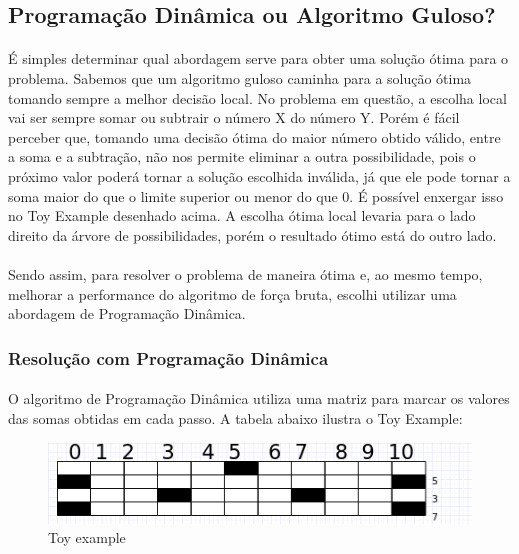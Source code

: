 \documentclass[a4paper, 12pt]{article}
\begin{document}
\subsection{Programação Dinâmica ou Algoritmo Guloso?}
\paragraph{}
É simples determinar qual abordagem serve para obter uma solução ótima para o problema. Sabemos que um algoritmo guloso caminha para a solução ótima tomando sempre a melhor decisão local. No problema em questão, a escolha local vai ser sempre somar ou subtrair o número X do número Y. Porém é fácil perceber que, tomando uma decisão ótima do maior número obtido válido, entre a soma e a subtração, não nos permite eliminar a outra possibilidade, pois o próximo valor poderá tornar a solução escolhida inválida, já que ele pode tornar a soma maior do que o limite superior ou menor do que 0. É possível enxergar isso no Toy Example desenhado acima. A escolha ótima local levaria para o lado direito da árvore de possibilidades, porém o resultado ótimo está do outro lado.

\paragraph{}
Sendo assim, para resolver o problema de maneira ótima e, ao mesmo tempo, melhorar a performance do algoritmo de força bruta, escolhi utilizar uma abordagem de Programação Dinâmica.

\subsubsection{Resolução com Programação Dinâmica}
\paragraph{}
O algoritmo de Programação Dinâmica utiliza uma matriz para marcar os valores das somas obtidas em cada passo. A tabela abaixo ilustra o Toy Example:

\begin{figure}[!h]
\centering
\includegraphics[scale=0.4]{pd.png}
\caption{Toy example}
\end{figure}
\end{document}
